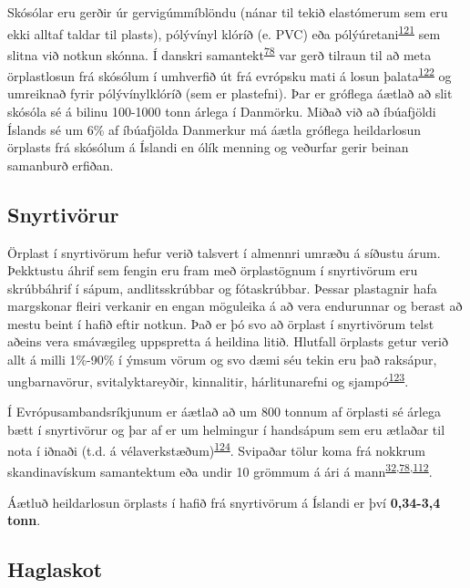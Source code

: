 \documentclass[icelandic,]{book}
\begin{document}
Skósólar eru gerðir úr gervigúmmíblöndu (nánar til tekið elastómerum sem eru ekki alltaf taldar til plasts), pólývínyl klóríð (e. PVC) eða pólýúretani\textsuperscript{\protect\hyperlink{ref-karak2009fundamentals}{121}} sem slitna við notkun skónna. Í danskri samantekt\textsuperscript{\protect\hyperlink{ref-lassen2015microplastics}{78}} var gerð tilraun til að meta örplastlosun frá skósólum í umhverfið út frá evrópsku mati á losun þalata\textsuperscript{\protect\hyperlink{ref-Pakalin2008}{122}} og umreiknað fyrir pólývínylklóríð (sem er plastefni). Þar er gróflega áætlað að slit skósóla sé á bilinu 100-1000 tonn árlega í Danmörku. Miðað við að íbúafjöldi Íslands sé um 6\% af íbúafjölda Danmerkur má áætla gróflega heildarlosun örplasts frá skósólum á Íslandi en ólík menning og veðurfar gerir beinan samanburð erfiðan.

\hypertarget{snyrtivorur}{%
\subsection*{Snyrtivörur}\label{snyrtivorur}}

Örplast í snyrtivörum hefur verið talsvert í almennri umræðu á síðustu árum. Þekktustu áhrif sem fengin eru fram með örplastögnum í snyrtivörum eru skrúbbáhrif í sápum, andlitsskrúbbar og fótaskrúbbar. Þessar plastagnir hafa margskonar fleiri verkanir en engan möguleika á að vera endurunnar og berast að mestu beint í hafið eftir notkun. Það er þó svo að örplast í snyrtivörum telst aðeins vera smávægileg uppspretta á heildina litið.
Hlutfall örplasts getur verið allt á milli 1\%-90\% í ýmsum vörum og svo dæmi séu tekin eru það raksápur, ungbarnavörur, svitalyktareyðir, kinnalitir, hárlitunarefni og sjampó\textsuperscript{\protect\hyperlink{ref-Leslie2014}{123}}.

Í Evrópusambandsríkjunum er áætlað að um 800 tonnum af örplasti sé árlega bætt í snyrtivörur og þar af er um helmingur í handsápum sem eru ætlaðar til nota í iðnaði (t.d. á vélaverkstæðum)\textsuperscript{\protect\hyperlink{ref-Scudo2017}{124}}. Svipaðar tölur koma frá nokkrum skandinavískum samantektum eða undir 10 grömmum á ári á mann\textsuperscript{\protect\hyperlink{ref-sundt2014sources}{32},\protect\hyperlink{ref-lassen2015microplastics}{78},\protect\hyperlink{ref-magnusson2016swedish}{112}}.

Áætluð heildarlosun örplasts í hafið frá snyrtivörum á Íslandi er því \textbf{0,34-3,4 tonn}.

\hypertarget{haglaskot}{%
\subsection*{Haglaskot}\label{haglaskot}}
\end{document}
